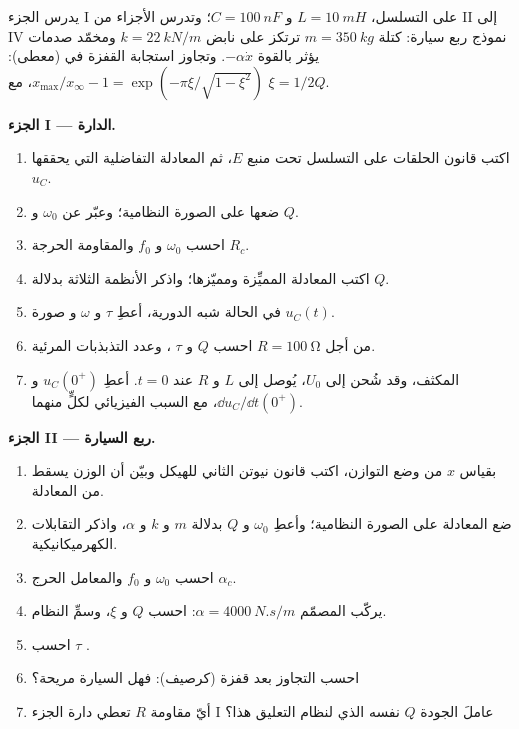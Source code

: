 \begin{problem}
\label{pb:b1:transient-regimes:1}
يدرس الجزء I  على التسلسل، $L = \qty{10}{mH}$ و $C = \qty{100}{nF}$؛
وتدرس الأجزاء من II إلى IV نموذج ربع سيارة: كتلة $m = \qty{350}{kg}$ ترتكز على
نابض $k = \qty{22}{kN/m}$ ومخمّد صدمات يؤثر بالقوة $-\alpha\dot x$.
وتجاوز استجابة القفزة في  (معطى):
$x_{\max}/x_\infty - 1 = \exp(-\pi\xi/\sqrt{1 - \xi^2})$، مع $\xi = 1/2Q$.

\medskip
\noindent\textbf{الجزء I --- الدارة.}
\begin{enumerate}
  \item اكتب قانون الحلقات  على التسلسل تحت منبع $E$، ثم
        المعادلة التفاضلية التي يحققها $u_C$.
  \item ضعها على الصورة النظامية؛ وعبّر عن $\omega_0$ و $Q$.
  \item احسب $\omega_0$ و $f_0$ والمقاومة الحرجة $R_c$.
  \item اكتب المعادلة المميِّزة ومميّزها؛ واذكر
        الأنظمة الثلاثة بدلالة $Q$.
  \item في الحالة شبه الدورية، أعطِ $\tau$ و $\omega$ و
        صورة $u_C(t)$.
  \item من أجل $R = \qty{100}{\ohm}$ احسب $Q$ و $\tau$ ،
        وعدد التذبذبات المرئية.
  \item المكثف، وقد شُحن إلى $U_0$، يُوصل إلى $L$ و $R$
        عند $t = 0$. أعطِ $u_C(0^+)$ و $\dd u_C/\dd t(0^+)$، مع
        السبب الفيزيائي لكلٍّ منهما.
\end{enumerate}

\medskip
\noindent\textbf{الجزء II --- ربع السيارة.}
\begin{enumerate}[resume]
  \item بقياس $x$ من وضع التوازن، اكتب قانون نيوتن
        الثاني للهيكل وبيّن أن الوزن يسقط من المعادلة.
  \item ضع المعادلة على الصورة النظامية؛ وأعطِ $\omega_0$ و $Q$ بدلالة
        $m$ و $k$ و $\alpha$، واذكر التقابلات
        الكهرميكانيكية.
  \item احسب $\omega_0$ و $f_0$ والمعامل الحرج
        $\alpha_c$.
  \item يركّب المصمّم $\alpha = \qty{4000}{N.s/m}$: احسب $Q$ و
        $\xi$، وسمِّ النظام.
  \item احسب $\tau$ .
  \item احسب التجاوز بعد قفزة (كرصيف): فهل السيارة
        مريحة؟
  \item أيّ مقاومة $R$ تعطي دارة الجزء I عاملَ الجودة $Q$
        نفسه الذي لنظام التعليق هذا؟
\end{enumerate}


\end{problem}
